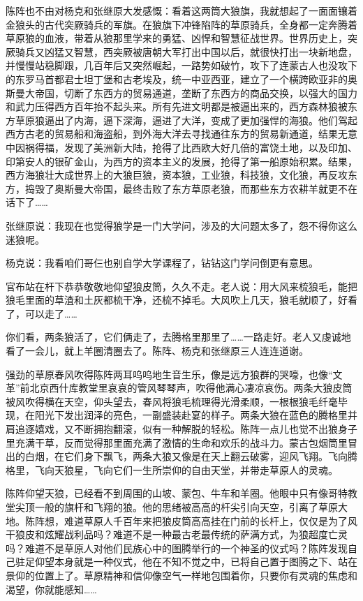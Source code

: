 \par 陈阵也不由对杨克和张继原大发感慨：看着这两筒大狼旗，我就想起了一面面镶着金狼头的古代突厥骑兵的军旗。在狼旗下冲锋陷阵的草原骑兵，全身都一定奔腾着草原狼的血液，带着从狼那里学来的勇猛、凶悍和智慧征战世界。世界历史上，突厥骑兵又凶猛又智慧，西突厥被唐朝大军打出中国以后，就很快打出一块新地盘，并慢慢站稳脚跟，几百年后又突然崛起，一路势如破竹，攻下了连蒙古人也没攻下的东罗马首都君士坦丁堡和古老埃及，统一中亚西亚，建立了一个横跨欧亚非的奥斯曼大帝国，切断了东西方的贸易通道，垄断了东西方的商品交换，以强大的国力和武力压得西方百年抬不起头来。所有先进文明都是被逼出来的，西方森林狼被东方草原狼逼出了内海，逼下深海，逼进了大洋，变成了更加强悍的海狼。他们驾起西方古老的贸易船和海盗船，到外海大洋去寻找通往东方的贸易新通道，结果无意中因祸得福，发现了美洲新大陆，抢得了比西欧大好几倍的富饶土地，以及印加、印第安人的银矿金山，为西方的资本主义的发展，抢得了第一船原始积累。结果，西方海狼壮大成世界上的大狼巨狼，资本狼，工业狼，科技狼，文化狼，再反攻东方，捣毁了奥斯曼大帝国，最终击败了东方草原老狼，而那些东方农耕羊就更不在话下了……
\par 张继原说：我现在也觉得狼学是一门大学问，涉及的大问题太多了，怨不得你这么迷狼呢。
\par 杨克说：我看咱们哥仨也别自学大学课程了，钻钻这门学问倒更有意思。
\par 官布站在杆下恭恭敬敬地仰望狼皮筒，久久不走。老人说：用大风来梳狼毛，能把狼毛里面的草渣和土灰都梳干净，还梳不掉毛。大风吹上几天，狼毛就顺了，好看了，可以走了……
\par 你们看，两条狼活了，它们俩走了，去腾格里那里了……一路走好。老人又虔诚地看了一会儿，就上羊圈清圈去了。陈阵、杨克和张继原三人连连道谢。
\par 强劲的草原春风吹得陈阵两耳呜呜地生音生乐，像是远方狼群的哭嚎，也像“文革”前北京西什库教堂里哀哀的管风琴琴声，吹得他满心凄凉哀伤。两条大狼皮筒被风吹得横在天空，仰头望去，春风将狼毛梳理得光滑柔顺，一根根狼毛纤毫毕现，在阳光下发出润泽的亮色，一副盛装赴宴的样子。两条大狼在蓝色的腾格里并肩追逐嬉戏，又不断拥抱翻滚，似有一种解脱的轻松。陈阵一点儿也觉不出狼身子里充满干草，反而觉得那里面充满了激情的生命和欢乐的战斗力。蒙古包烟筒里冒出的白烟，在它们身下飘飞，两条大狼又像是在天上翻云破雾，迎风飞翔。飞向腾格里，飞向天狼星，飞向它们一生所崇仰的自由天堂，并带走草原人的灵魂。
\par 陈阵仰望天狼，已经看不到周围的山坡、蒙包、牛车和羊圈。他眼中只有像哥特教堂尖顶一般的旗杆和飞翔的狼。他的思绪被高高的杆尖引向天空，引离了草原大地。陈阵想，难道草原人千百年来把狼皮筒高高挂在门前的长杆上，仅仅是为了风干狼皮和炫耀战利品吗？难道不是一种最古老最传统的萨满方式，为狼超度亡灵吗？难道不是草原人对他们民族心中的图腾举行的一个神圣的仪式吗？陈阵发现自己驻足仰望本身就是一种仪式，他在不知不觉之中，已将自己置于图腾之下、站在景仰的位置上了。草原精神和信仰像空气一样地包围着你，只要你有灵魂的焦虑和渴望，你就能感知……
